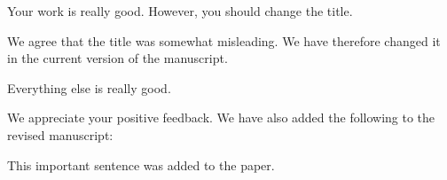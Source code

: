 
\begin{revcomment}
    Your work is really good. However, you should change the title.
\end{revcomment}
\begin{revresponse}
    We agree that the title was somewhat misleading. We have therefore changed it in the current version of the manuscript.
\end{revresponse}

\begin{revcomment}
    Everything else is really good.
\end{revcomment}
\begin{revresponse}
    We appreciate your positive feedback. We have also added the following to the revised manuscript:
    \begin{changes}
        This important sentence was added to the paper.
    \end{changes}
\end{revresponse}
